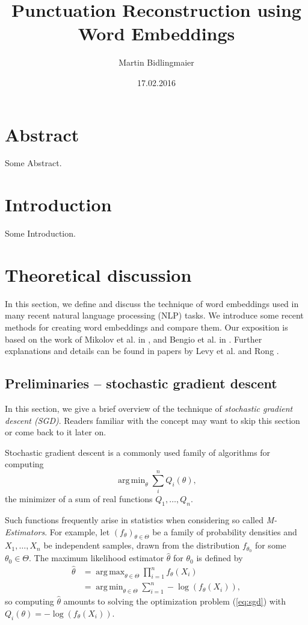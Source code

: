 \documentclass{amsart}
\theoremstyle{plain}
\theoremstyle{definition}
\DeclareMathOperator*{\argmin}{arg\,min}
\DeclareMathOperator*{\argmax}{arg\,max}
\begin{document}
\title{Punctuation Reconstruction using Word Embeddings}
\author{Martin Bidlingmaier}
\date{17.02.2016}
\maketitle

\section{Abstract}
  Some Abstract.

\section{Introduction}
  Some Introduction.

\section{Theoretical discussion}
In this section, we define and discuss the technique of word embeddings used in many recent natural language processing (NLP) tasks.
We introduce some recent methods for creating word embeddings and compare them.
Our exposition is based on the work of Mikolov et al. in \cite{DBLP:journals/corr/MikolovSCCD13}, \cite{DBLP:journals/corr/abs-1301-3781} and Bengio et al. in \cite{Morin05hierarchicalprobabilistic}.
Further explanations and details can be found in papers by Levy et al. \cite{DBLP:journals/corr/GoldbergL14} and Rong \cite{DBLP:journals/corr/Rong14}.

\subsection{Preliminaries -- stochastic gradient descent}
In this section, we give a brief overview of the technique of \emph{stochastic gradient descent (SGD)}.
Readers familiar with the concept may want to skip this section or come back to it later on.

Stochastic gradient descent is a commonly used family of algorithms for computing
\begin{equation}
  \label{eq:sgd}
  \argmin_\theta \sum_i^n Q_i(\theta),
\end{equation}
the minimizer of a sum of real functions $Q_1, \dots, Q_n$.

Such functions frequently arise in statistics when considering so called \emph{M-Estimators}.
For example, let $(f_\theta)_{\theta \in \Theta}$ be a family of probability densities and $X_1, \dots, X_n$ be independent samples, drawn from the distribution $f_{\theta_0}$ for some $\theta_0 \in \Theta$.
The maximum likelihood estimator $\hat \theta$ for $\theta_0$ is defined by
\begin{align*}
  \hat \theta & = \argmax_{\theta \in \Theta} \prod_{i = 1}^n f_\theta(X_i) \\
              & = \argmin_{\theta \in \Theta} \sum_{i = 1}^n - \log(f_\theta(X_i)),
\end{align*}
so computing $\hat \theta$ amounts to solving the optimization problem (\ref{eq:sgd}) with $Q_i(\theta) = -\log(f_\theta(X_i))$.
\end{document}
